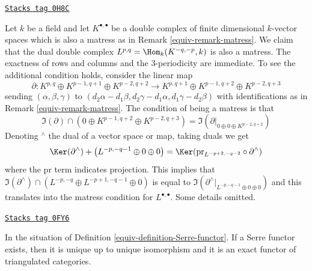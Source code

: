 \begin{remark}
\label{equiv-remark-dual-matress}
\href{https://stacks.math.columbia.edu/tag/0H8C}{\texttt{Stacks tag 0H8C}}

Let $k$ be a field and let $K^{\bullet, \bullet}$ be a double complex
of finite dimensional $k$-vector spaces which is also a matress as in
Remark \ref{equiv-remark-matress}. We claim that the dual double complex
$L^{p, q} = \Hom_k(K^{-q, -p}, k)$ is also a matress. The exactness of
rows and columns and the 3-periodicity are immediate. To see the
additional condition holds, consider the linear map
$$
\partial :
K^{p, q} \oplus K^{p - 1, q + 1} \oplus K^{p - 2, q + 2}
\longrightarrow
K^{p, q + 1} \oplus K^{p - 1, q + 2} \oplus K^{p - 2, q + 3}
$$
sending $(\alpha, \beta, \gamma)$ to
$(d_2 \alpha - d_1 \beta, d_2 \gamma - d_1 \alpha, d_1 \gamma - d_2 \beta)$
with identifications as in Remark \ref{equiv-remark-matress}.
The condition of being a matress is that
$$
\Im(\partial) \cap
\left( 0 \oplus K^{p - 1, q + 2} \oplus K^{p - 2, q + 3} \right)
=
\Im(\partial|_{0 \oplus 0 \oplus K^{p - 2, q + 2}})
$$
Denoting ${}^\wedge$ the dual of a vector space or map, taking duals
we get
$$
\Ker(\partial^\wedge) +
\left(L^{-p, -q - 1} \oplus 0 \oplus 0 \right)
=
\Ker(\text{pr}_{L^{-p + 2, -q - 2}} \circ \partial^\wedge)
$$
where the $\text{pr}$ term indicates projection. This implies
that
$\Im(\partial^\wedge) \cap (L^{-p, -q} \oplus L^{-p + 1, -q - 1} \oplus 0)$
is equal to
$\Im(\partial^\wedge|_{L^{-p, -q - 1} \oplus 0 \oplus 0})$ and this
translates into the matress condition for $L^{\bullet, \bullet}$.
Some details omitted.
\end{remark}

\begin{lemma}
\label{equiv-lemma-Serre-functor}
\href{https://stacks.math.columbia.edu/tag/0FY6}{\texttt{Stacks tag 0FY6}}

In the situation of Definition \ref{equiv-definition-Serre-functor}.
If a Serre functor exists, then it is unique up to unique isomorphism and
it is an exact functor of triangulated categories.
\end{lemma}

